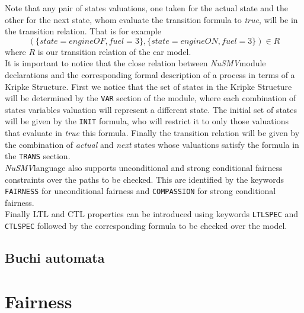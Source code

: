 \documentclass[12pt]{article}
\newcommand{\nusmv}{\mbox{\textit{NuSMV}}}
\begin{document}
Note that any pair of states valuations, one taken for the actual state and the
other for the next state, whom evaluate the transition formula to \emph{true},
will be in the transition relation. That is for example
$$(\{state=engineOF, fuel=3\},\{state=engineON,fuel=3\}) \in R$$ where $R$ is our
transition relation of the car model.\\
It is important to notice that the close relation between \nusmv module declarations and the corresponding formal description of a process in terms of a Kripke Structure. First we notice that the set of states in the Kripke Structure will be determined by the \texttt{VAR} section of the module, where each combination of states variables valuation will represent a different state. The initial set of states will be given by the \texttt{INIT} formula, who will restrict it to only those valuations that evaluate in \textit{true} this formula. Finally the transition relation will be given by the combination of \textit{actual} and \textit{next} states whose valuations satisfy the formula in the \texttt{TRANS} section.\\
\nusmv language also supports unconditional and strong conditional fairness constraints over the paths to be checked. This are identified by the keywords \texttt{FAIRNESS} for unconditional fairness and \texttt{COMPASSION} for strong conditional fairness.\\
Finally LTL and CTL properties can be introduced using keywords \texttt{LTLSPEC} and \texttt{CTLSPEC} followed by the corresponding formula to be checked over the model.


\subsection{Buchi automata}\label{buchi}


\section{Fairness}\label{fairness}
\end{document}
